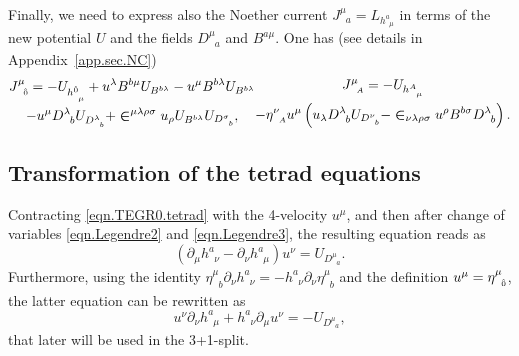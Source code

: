 \documentclass[
10pt, %
a4paper, %
oneside, %
twocolumn,
headinclude,footinclude, %
BCOR5mm, %
]{scrartcl}
\newcommand{\sA}{\mathsmaller A}
\newcommand{\tetrsymbol}{h}
\newcommand{\itetrsymbol}{\eta}
\newcommand{\itetr}[2]{\itetrsymbol^{#1}_{\phantom{#1}#2}}
\newcommand{\tetr}[2]{\tetrsymbol^{#1}_{\phantom{#1}#2}}
\newcommand{\D}[1]{\partial_{#1}} %
\newcommand{\Tors}[2]{T^{#1}_{\phantom{#1}#2}}
\newcommand{\Dm}[2]{D_{\phantom{#2}#1}^{#2}}	%
\newcommand{\Bm}[2]{B^{#1#2}}	%
\newcommand{\Laghodge}{L}%
\newcommand{\Um}{U}%
\newcommand{\EM}[2]{\Sigma^{#1}_{\phantom{#1}#2}}
\newcommand{\LCsymb}{\bm{\in}}    %
\newcommand{\NC}[2]{J^{#2}_{\phantom{#2}#1}}
\newcommand{\indalg}[1]{\hat{\mathsmaller{#1}}}
\begin{document}
	
	Finally, we need to express also the Noether current $ \NC{a}{\mu} = \Laghodge_{\tetr{a}{\mu}} 
	$ in 
	terms of the 
	new potential $ \Um $ and the fields $ \Dm{a}{\mu} $ and $ \Bm{a}{\mu} $. One has (see details 
	in Appendix~\ref{app.sec.NC})
	\begin{subequations}\label{eqn.JiA}
		\begin{multline}\label{eqn.Ji0}
			\NC{\indalg{0}}{\mu} = 
				-\Um_{\tetr{\indalg{0}}{\mu}}
				+ u^\lambda \Bm{b}{\mu} \Um_{\Bm{b}{\lambda}} 
				- u^\mu \Bm{b}{\lambda} \Um_{\Bm{b}{\lambda}}\\ 
				- u^\mu \Dm{b}{\lambda} \Um_{\Dm{b}{\lambda}}
				+ \LCsymb^{\mu\lambda\rho\sigma} u_\rho \Um_{\Bm{b}{\lambda}}
				\Um_{\Dm{b}{\sigma}},
		\end{multline}
		\begin{multline}
				\NC{\sA}{\mu} = -\Um_{\tetr{\sA}{\mu}}	\\
				- \itetr{\nu}{\sA}u^\mu
				\left(
				u_\lambda \Dm{b}{\lambda} \Um_{\Dm{b}{\nu}} 
				- \LCsymb_{\nu\lambda\rho\sigma}u^\rho\Bm{b}{\sigma}\Dm{b}{\lambda}
				\right).
		\end{multline}
	\end{subequations}	


	\subsection{Transformation of the tetrad equations}
	
	
	
	Contracting \eqref{eqn.TEGR0.tetrad} with the 4-velocity $ u^\mu $, and then after 
	change of variables \eqref{eqn.Legendre2} and \eqref{eqn.Legendre3}, the 
	resulting equation reads as
	\begin{equation}
		(\D{\mu}\tetr{a}{\nu} - \D{\nu}\tetr{a}{\mu}) u^\nu = \Um_{\Dm{a}{\mu}}.
	\end{equation}
	Furthermore, using the identity $ \itetr{\mu}{b}\D{\nu}\tetr{a}{\nu} = - 
	\tetr{a}{\nu}\D{\nu}\itetr{\mu}{b}$ and the definition $ u^\mu = \itetr{\mu}{\indalg{0}} 
	$, the 
	latter equation can be rewritten as
	\begin{equation}
		u^\nu\D{\nu}\tetr{a}{\mu} + \tetr{a}{\nu}\D{\mu}u^\nu =-\Um_{\Dm{a}{\mu}},
	\end{equation}
	that later will be used in the 3+1-split.
	
\end{document}
